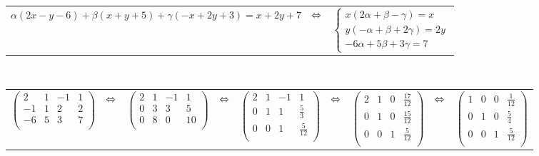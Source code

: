 \documentclass{article}
\begin{document}
	\begin{center}
		\begin{tabular}{ccc}
			$\alpha(2x-y-6) + \beta(x+y+5) + \gamma(-x+2y+3) = x+2y+7$
			& $\hfill \Leftrightarrow \hfill$ &
			$\begin{cases}
			x(2\alpha + \beta -\gamma) = x \\
			y(-\alpha + \beta + 2\gamma) = 2y \\
			-6\alpha + 5\beta + 3\gamma = 7
			\end{cases} $ 
		\end{tabular}
		\\
		\fontsize{8}{8}
		\begin{tabular}{ccccccccc}
			$\left(\begin{array}{ccc|c}
			2 	& 1 	& -1 	& 1	\\
			-1	& 1		& 2 	& 2	\\
			-6	& 5		& 3 	& 7	\\
			\end{array}\right)$
			& $\hfill \Leftrightarrow \hfill$ &
			$\left(\begin{array}{ccc|c}
			2 	& 1 	& -1 	& 1	\\
			0	& 3		& 3 	& 5	\\
			0	& 8		& 0 	& 10	\\
			\end{array}\right)$
			& $\hfill \Leftrightarrow \hfill$ & 
			$\left(\begin{array}{ccc|c}
			2 	& 1 	& -1 	& 1	\\
			0	& 1		& 1		& \frac{5}{3}	\\
			0	& 0		& 1 	& \frac{5}{12}	\\
			\end{array}\right)$
			& $\hfill \Leftrightarrow \hfill$ & 
			$\left(\begin{array}{ccc|c}
			2 	& 1 	& 0 	& \frac{17}{12}	\\
			0	& 1		& 0		& \frac{15}{12}	\\
			0	& 0		& 1 	& \frac{5}{12}	\\
			\end{array}\right)$
			& $\hfill \Leftrightarrow \hfill$ & 
			$\left(\begin{array}{ccc|c}
			1 	& 0		& 0 	& \frac{1}{12}	\\
			0	& 1		& 0		& \frac{5}{4}	\\
			0	& 0		& 1 	& \frac{5}{12}	\\
			\end{array}\right)$
		\end{tabular}
		\fontsize{12}{12}
	\end{center}
\end{document}
